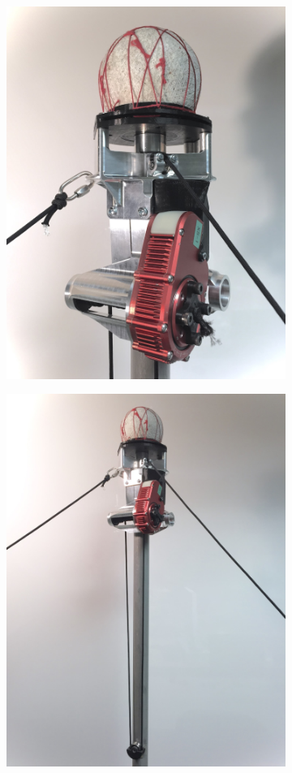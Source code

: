 \begin{figure}
\centering
\begin{subfigure}{.5\textwidth}
  \centering
  \includegraphics[width=.8\linewidth]{tex/img/sb_v2_close}
  \caption{}
  \label{fig:sbv2_close}
\end{subfigure}%
\begin{subfigure}{.5\textwidth}
  \centering
  \includegraphics[width=.8\linewidth]{tex/img/sb_v2_far}

\end{subfigure}
\end{figure}
